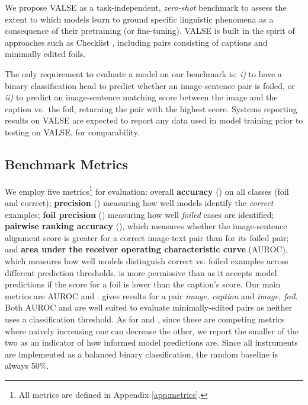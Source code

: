 \documentclass[11pt]{article}
\newcommand{\dataset}{VALSE}
\begin{document}
\begin{comment}
        \midrule
        \multirow{4}{*}{FOIL it!} &  & 50.0 & -- & -- & -- & 70.8 & 55.9 & 71.5 & \\
         &  & 50.0 & -- & -- & -- & 72.3 & 98.8 & 94.3 & \\ 
         &  & 50.0 & -- & -- & -- & 69.3 & 12.9 & 48.8 & \\ 
         &  & 50.0 & 77.5 & 80.7 & 88.8 & 87.1 & 86.9 & 86.9  & \\         
        \bottomrule
    \end{tabular}
    }
    \caption{Results on all \dataset{} instruments and FOIL it!
}
    \label{tab:bench_results}
\end{table*}
\end{comment} We propose \dataset{} as a task-independent, \emph{zero-shot} benchmark to assess the extent to which models learn to ground specific linguistic phenomena as a consequence of their pretraining (or fine-tuning). \dataset{} is built in the spirit of approaches such as Checklist \cite{ribeiro-etal-2020-beyond},
including
pairs consisting of captions and minimally edited foils.


The only requirement to
evaluate a model on our benchmark is:
\textit{i)} to have a binary classification head to predict whether an image-sentence pair is foiled,
or
\textit{ii)} to predict an image-sentence matching score between the image and the caption vs.\ the foil, returning the pair with the highest score. Systems reporting results on \dataset{} are expected to report any data used in model training prior to testing on \dataset{}, for comparability. 

\subsection{Benchmark Metrics} \label{subsec:metrics}
We employ five metrics\footnote{All metrics are defined in Appendix \ref{app:metrics}.} for evaluation:
overall {\bf accuracy} () on all classes (foil and correct);
{\bf precision} () measuring how well models identify the \emph{correct} examples; {\bf foil precision} () measuring how well \emph{foiled} cases are identified;
{\bf pairwise ranking accuracy} (), which measures whether the image-sentence alignment score is greater for a correct image-text pair than for its foiled pair;
and
{\bf area under the receiver operating characteristic curve} (AUROC), which measures how well models distinguish correct vs. foiled examples across different prediction thresholds.
 is more permissive than  as it accepts model predictions if the score for a foil is lower than the caption's score.
Our main metrics are AUROC and .  gives results for a pair \textit{image, caption} and \textit{image, foil}. Both AUROC and  are well suited to evaluate minimally-edited pairs as neither uses a classification threshold. 
As for  and , since these are competing metrics where naively increasing one can decrease the other, we report the smaller of the two as an indicator of how informed model predictions are.
Since all instruments are implemented as a balanced binary classification, the random baseline is always 50\%.
\end{document}
